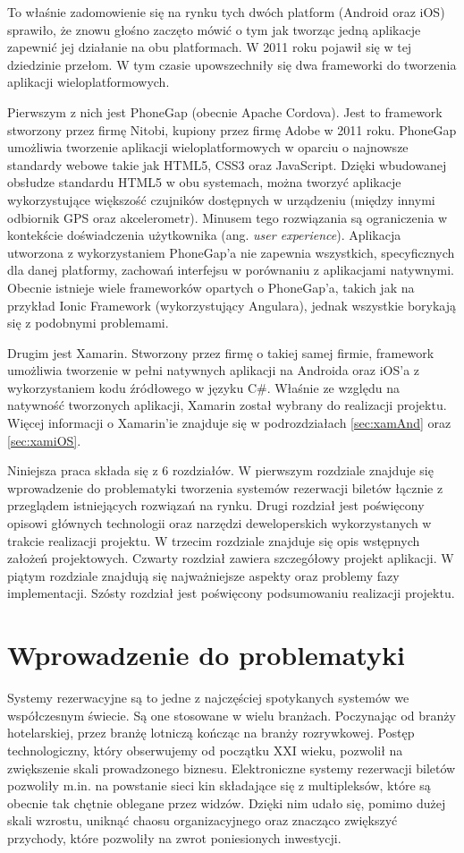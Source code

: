 To właśnie zadomowienie się na rynku tych dwóch platform (Android oraz iOS) sprawiło, że znowu głośno zaczęto mówić o tym jak tworząc jedną aplikacje zapewnić jej działanie na obu platformach. W 2011 roku pojawił się w tej dziedzinie przełom. W tym czasie upowszechniły się dwa frameworki do tworzenia aplikacji wieloplatformowych. 

Pierwszym z nich jest PhoneGap (obecnie Apache Cordova). Jest to framework stworzony przez firmę Nitobi, kupiony przez firmę Adobe w 2011 roku. PhoneGap umożliwia tworzenie aplikacji wieloplatformowych w oparciu o najnowsze standardy webowe takie jak HTML5, CSS3 oraz JavaScript. Dzięki wbudowanej obsłudze standardu HTML5 w obu systemach, można tworzyć aplikacje wykorzystujące większość czujników dostępnych w urządzeniu (między innymi odbiornik GPS oraz akcelerometr). Minusem tego rozwiązania są ograniczenia w kontekście doświadczenia użytkownika (ang. \textit{user experience}). Aplikacja utworzona z wykorzystaniem PhoneGap'a nie zapewnia wszystkich, specyficznych dla danej platformy, zachowań interfejsu w porównaniu z aplikacjami natywnymi. Obecnie istnieje wiele frameworków opartych o PhoneGap'a, takich jak na przykład Ionic Framework (wykorzystujący Angulara), jednak wszystkie borykają się z podobnymi problemami.

Drugim jest Xamarin. Stworzony przez firmę o takiej samej firmie, framework umożliwia tworzenie w pełni natywnych aplikacji na Androida oraz iOS'a z wykorzystaniem kodu źródłowego w języku C\#. Właśnie ze względu na natywność tworzonych aplikacji, Xamarin został wybrany do realizacji projektu. Więcej informacji o Xamarin'ie znajduje się w podrozdziałach \ref{sec:xamAnd} oraz \ref{sec:xamiOS}.

Niniejsza praca składa się z 6 rozdziałów. W pierwszym rozdziale znajduje się wprowadzenie do problematyki tworzenia systemów rezerwacji biletów łącznie z przeglądem istniejących rozwiązań na rynku. Drugi rozdział jest poświęcony opisowi głównych technologii oraz narzędzi deweloperskich wykorzystanych w trakcie realizacji projektu. W trzecim rozdziale znajduje się opis wstępnych założeń projektowych. Czwarty rozdział zawiera szczegółowy projekt aplikacji. W piątym rozdziale znajdują się najważniejsze aspekty oraz problemy fazy implementacji. Szósty rozdział jest poświęcony podsumowaniu realizacji projektu.

\chapter{Wprowadzenie do problematyki}
Systemy rezerwacyjne są to jedne z najczęściej spotykanych systemów we współczesnym świecie. Są one stosowane w wielu branżach. Poczynając od branży hotelarskiej, przez branżę lotniczą kończąc na branży rozrywkowej. Postęp technologiczny, który obserwujemy od początku XXI wieku, pozwolił na zwiększenie skali prowadzonego biznesu. Elektroniczne systemy rezerwacji biletów pozwoliły m.in. na powstanie sieci kin składające się z multipleksów, które są obecnie tak chętnie oblegane przez widzów. Dzięki nim udało się, pomimo dużej skali wzrostu, uniknąć chaosu organizacyjnego oraz znacząco zwiększyć przychody, które pozwoliły na zwrot poniesionych inwestycji. 


